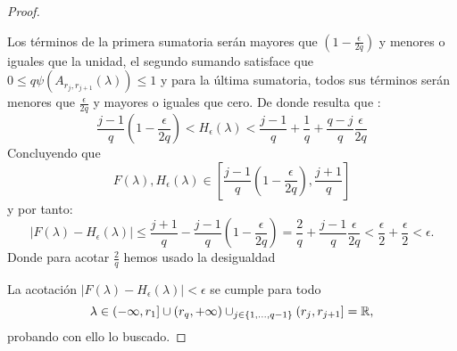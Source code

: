\begin{proof}
\begin{itemize}
        Los términos de la primera sumatoria serán mayores que $\left(1-\frac{\epsilon}{2q} \right)$ y menores o iguales que la unidad, 
        el segundo sumando satisface que 
        $0 \leq q\psi( A_{r_j, r_{j+1}}(\lambda)) \leq 1$
        y para la última sumatoria, todos sus términos serán menores que $\frac{\epsilon}{2q}$ y mayores o iguales que cero.
        De donde resulta que : 
        \begin{equation}
            \frac{j-1}{q}\left(1-\frac{\epsilon}{2q} \right)  
            <
            H_\epsilon(\lambda) 
            <
            \frac{j-1}{q} 
            + 
            \frac{1}{q} 
            + 
            \frac{q-j}{q} \frac{\epsilon}{2q} 
        \end{equation}
        Concluyendo que 
        \begin{equation}
            F(\lambda), H_\epsilon(\lambda) 
            \in 
            \left[
                \frac{j-1}{q}\left(1-\frac{\epsilon}{2q}\right),
                \frac{j+1}{q}
            \right]
        \end{equation}
        y por tanto: 
        \begin{equation}
            | F(\lambda) - H_{\epsilon}(\lambda) | 
            \leq \frac{j+1}{q} -  \frac{j-1}{q}\left(1-\frac{\epsilon}{2q}\right)
            = 
            \frac{2}{q} + \frac{j-1}{q}\frac{\epsilon}{2q}
            < \frac{\epsilon}{2} + \frac{\epsilon}{2}
            < \epsilon.
        \end{equation}
        Donde para acotar $\frac{2}{q}$ hemos usado la desigualdad 
    \end{itemize}
    La acotación $| F(\lambda) - H_{\epsilon}(\lambda) | < \epsilon$ se cumple para todo
    \begin{equation}
        \lambda \in (- \infty, r_1] \cup (r_q,+\infty) \cup_{j \in \{1, ..., q-1\}} (r_{j},r_{j+1}] = \mathbb{R},
    \end{equation}
    probando con ello lo buscado.
\end{proof}      

